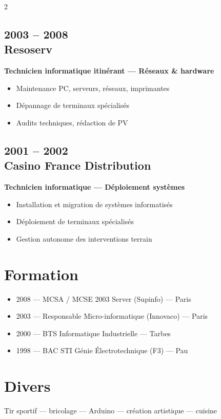 \documentclass[11pt,a4paper]{article}
\begin{document}
\begin{paracol}{2}
\subsection*{2003 -- 2008 \\ Resoserv}
\textbf{Technicien informatique itinérant — Réseaux \& hardware}
\begin{itemize}[leftmargin=*]
  \item Maintenance PC, serveurs, réseaux, imprimantes
  \item Dépannage de terminaux spécialisés
  \item Audits techniques, rédaction de PV
\end{itemize}

\subsection*{2001 -- 2002 \\ Casino France Distribution}
\textbf{Technicien informatique — Déploiement systèmes}
\begin{itemize}[leftmargin=*]
  \item Installation et migration de systèmes informatisés
  \item Déploiement de terminaux spécialisés
  \item Gestion autonome des interventions terrain
\end{itemize}

\section*{Formation}
\begin{itemize}[leftmargin=*]
  \item 2008 — MCSA / MCSE 2003 Server (Supinfo) — Paris
  \item 2003 — Responsable Micro-informatique (Innovaco) — Paris
  \item 2000 — BTS Informatique Industrielle — Tarbes
  \item 1998 — BAC STI Génie Électrotechnique (F3) — Pau
\end{itemize}

\section*{Divers}
Tir sportif — bricolage — Arduino — création artistique — cuisine

\end{paracol}
\end{document}

